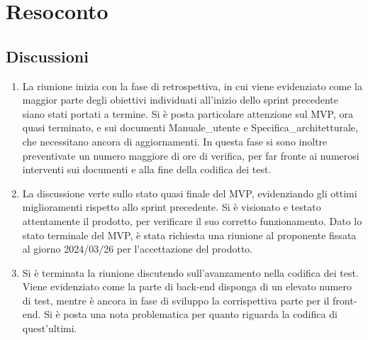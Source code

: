 \section{Resoconto} \label{sec:resoconto}
\subsection{Discussioni} \label{subsec:resdiscussione}
\begin{enumerate}
     \item La riunione inizia con la fase di retrospettiva, in cui viene evidenziato come la maggior parte degli obiettivi individuati all'inizio dello sprint precedente siano stati portati a termine. Si è posta particolare attenzione sul MVP, ora quasi terminato, e sui documenti Manuale\_utente e Specifica\_architetturale, che necessitano ancora di aggiornamenti. In questa fase si sono inoltre preventivate un numero maggiore di ore di verifica, per far fronte ai numerosi interventi sui documenti e alla fine della codifica dei test.
    \item La discussione verte sullo stato quasi finale del MVP, evidenziando gli ottimi miglioramenti rispetto allo sprint precedente. Si è visionato e testato attentamente il prodotto, per verificare il suo corretto funzionamento. Dato lo stato terminale del MVP, è stata richiesta una riunione al proponente fissata al giorno 2024/03/26 per l'accettazione del prodotto.
    \item Si è terminata la riunione discutendo sull'avanzamento nella codifica dei test. Viene evidenziato come la parte di back-end disponga di un elevato numero di test, mentre è ancora in fase di sviluppo la corrispettiva parte per il front-end. Si è posta una nota problematica per quanto riguarda la codifica di quest'ultimi.
\end{enumerate}


